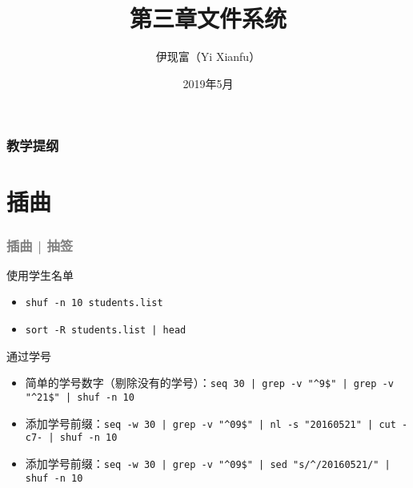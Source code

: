 



\title[文件系统]{第三章\quad 文件系统}
\author[Yixf]{伊现富（Yi Xianfu）}
\date{2019年5月}


\begin{frame}
  \titlepage
\end{frame}

\begin{frame}[plain,label=current]
  \frametitle{教学提纲}
  \setcounter{tocdepth}{3}
  \begin{multicols}{2}
    \tableofcontents
  \end{multicols}
\end{frame}

\section{插曲}
\begin{frame}[fragile]
  \frametitle{\textcolor{gray}{插曲 | 抽签}}
  \begin{block}{使用学生名单}
    \begin{itemize}
      \item \verb=shuf -n 10 students.list=
      \item \verb=sort -R students.list | head=
    \end{itemize}
  \end{block}
  \pause
  \begin{block}{通过学号}
    \begin{itemize}
      \item 简单的学号数字（剔除没有的学号）：\verb=seq 30 | grep -v "^9$" | grep -v "^21$" | shuf -n 10=
      \item 添加学号前缀：\verb=seq -w 30 | grep -v "^09$" | nl -s "20160521" | cut -c7- | shuf -n 10=
      \item 添加学号前缀：\verb=seq -w 30 | grep -v "^09$" | sed "s/^/20160521/" | shuf -n 10=
    \end{itemize}
  \end{block}
\end{frame}

